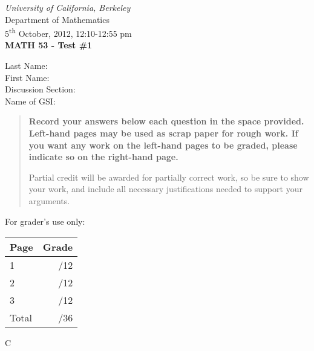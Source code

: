 \documentclass[12pt]{article}
\newcommand{\skipline}{\vspace{12pt}}
\begin{document}
\author{Instructor: Sean Fitzpatrick}
\thispagestyle{plain}
\begin{center}
\emph{University of California, Berkeley}\\
Department of Mathematics\\
5\textsuperscript{th} October, 2012, 12:10-12:55 pm\\
{\bf MATH 53 - Test \#1}\\
\end{center}
\skipline \skipline \skipline \noindent \skipline
Last Name:\underline{\hspace{350pt}}\\
\skipline
First Name:\underline{\hspace{348pt}}\\
\skipline
Discussion Section: \underline{\hspace{307pt}}\\
\skipline
Name of GSI: \underline{\hspace{336pt}}\\

\vspace{0.5in}


\begin{quote}
 {\bf Record your answers below each question in the space provided.    Left-hand pages may be used as scrap paper for rough work.  If you want any work on the left-hand pages to be graded, please indicate so on the right-hand page.
 
 \bigskip
 
Partial credit will be awarded for partially correct work, so be sure to show your work, and include all necessary justifications needed to support your arguments.}
\end{quote}


\vspace{0.5in}

For grader's use only:

\begin{table}[hbt]
\begin{center}
\begin{tabular}{|l|r|} \hline
Page&Grade\\
\hline \hline
\cline{1-2} 1 & \enspace\enspace\enspace\enspace\enspace\enspace/12\\
\cline{1-2} 2 & \enspace\enspace\enspace\enspace\enspace\enspace/12\\
\cline{1-2} 3 & \enspace\enspace\enspace\enspace\enspace\enspace/12\\
\cline{1-2} Total & \enspace\enspace\enspace\enspace\enspace\enspace/36\\
\hline
\end{tabular}

\skipline

\skipline

\skipline

\skipline

C
\end{center}
\end{table}
\newpage
\end{document}
